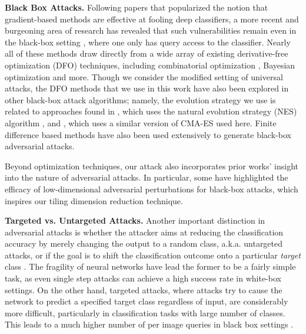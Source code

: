 \documentclass[letterpaper]{article}
\begin{document}
	\textbf{Black Box Attacks.} Following papers that popularized the notion that gradient-based methods are effective at fooling deep classifiers, a more recent and burgeoning area of research has revealed that such vulnerabilities remain even in the black-box setting \cite{autozoom,zoo,bandits,nes}, where one only has query access to the classifier. Nearly all of these methods draw directly from a wide array of existing derivative-free optimization (DFO) techniques, including combinatorial optimization \cite{parsimonious}, Bayesian optimization \cite{bayesopt,bayesopt_tutorial} and more. Though we consider the modified setting of universal attacks, the DFO methods that we use in this work have also been explored in other black-box attack algorithms; namely, the evolution strategy we use is related to approaches found in \cite{nes}, which uses the natural evolution strategy (NES) algorithm \cite{wierstra2014natural}, and \cite{meunier2019yet}, which uses a similar version of CMA-ES used here. Finite difference based methods \cite{zoo,nes,bandits} have also been used extensively to generate black-box adversarial attacks.
	
	
	Beyond optimization techniques, our attack also incorporates prior works' insight into the nature of adversarial attacks. In particular, some \cite{bandits,sharma2019effectiveness} have highlighted the efficacy of low-dimensional adversarial perturbations for black-box attacks, which inspires our tiling dimension reduction technique.
	
	\textbf{Targeted vs. Untargeted Attacks.} Another important distinction in adversarial attacks is whether the attacker aims at reducing the classification accuracy by merely changing the output to a random class, a.k.a. untargeted attacks, or if the goal is to shift the classification outcome onto a particular \emph{target} class \cite{carlini2017}. The fragility of neural networks have lead the former to be a fairly simple task, as even single step attacks can achieve a high success rate in white-box settings. On the other hand, targeted attacks, where attacks try to cause the network to predict a specified target class regardless of input, are considerably more difficult, particularly in classification tasks with large number of classes. This leads to a much higher number of per image queries in black box settings \cite{autozoom}.
	
\end{document}
